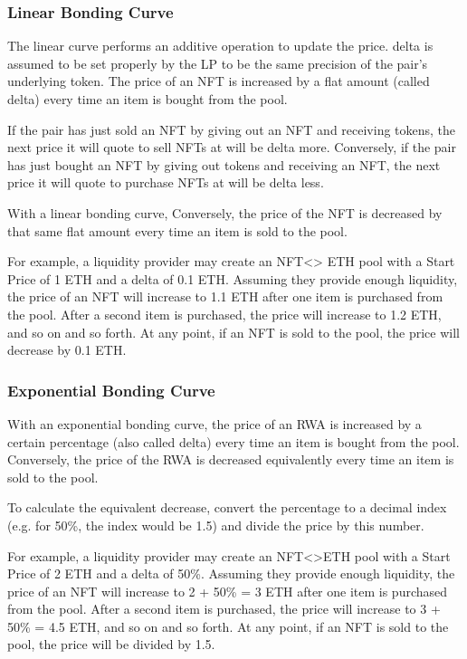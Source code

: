 \documentclass[11pt]{article}
\begin{document}
\subsubsection{Linear Bonding Curve}

The linear curve performs an additive operation to update the price. delta is assumed to be set properly by the LP to be the same precision of the pair's underlying token. The price of an NFT is increased by a flat amount (called delta) every time an item is bought from the pool.


If the pair has just sold an NFT by giving out an NFT and receiving tokens, the next price it will quote to sell NFTs at will be delta more. Conversely, if the pair has just bought an NFT by giving out tokens and receiving an NFT, the next price it will quote to purchase NFTs at will be delta less.


With a linear bonding curve, Conversely, the price of the NFT is decreased by that same flat amount every time an item is sold to the pool.


For example, a liquidity provider may create an NFT<> ETH pool with a Start Price of 1 ETH and a delta of 0.1 ETH. Assuming they provide enough liquidity, the price of an NFT will increase to 1.1 ETH after one item is purchased from the pool. After a second item is purchased, the price will increase to 1.2 ETH, and so on and so forth. At any point, if an NFT is sold to the pool, the price will decrease by 0.1 ETH.


\subsubsection{Exponential Bonding Curve}

With an exponential bonding curve, the price of an RWA is increased by a certain percentage (also called delta) every time an item is bought from the pool. Conversely, the price of the RWA is decreased equivalently every time an item is sold to the pool.


To calculate the equivalent decrease, convert the percentage to a decimal index (e.g. for 50\%, the index would be 1.5) and divide the price by this number.


For example, a liquidity provider may create an NFT<>ETH pool with a Start Price of 2 ETH and a delta of 50\%. Assuming they provide enough liquidity, the price of an NFT will increase to 2 + 50\% = 3 ETH after one item is purchased from the pool. After a second item is purchased, the price will increase to 3 + 50\% = 4.5 ETH, and so on and so forth. At any point, if an NFT is sold to the pool, the price will be divided by 1.5.
\end{document}
